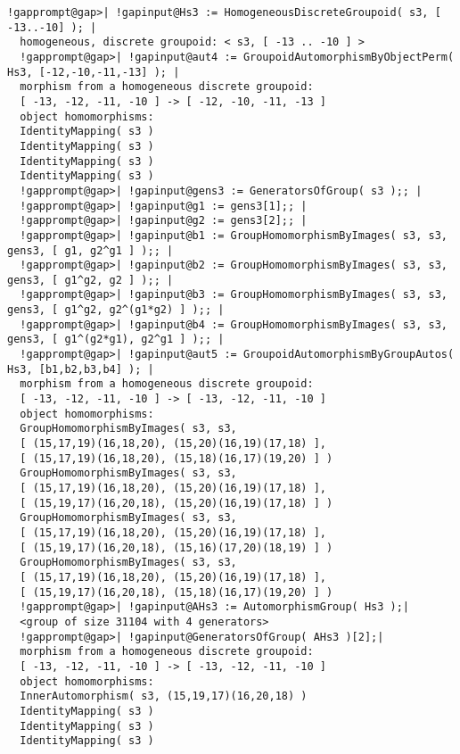 \documentclass[a4paper,11pt]{report}
\begin{document}
{{{\begin{Verbatim}[commandchars=!@|,fontsize=\small,frame=single,label=Example]
  !gapprompt@gap>| !gapinput@Hs3 := HomogeneousDiscreteGroupoid( s3, [ -13..-10] ); |
  homogeneous, discrete groupoid: < s3, [ -13 .. -10 ] >
  !gapprompt@gap>| !gapinput@aut4 := GroupoidAutomorphismByObjectPerm( Hs3, [-12,-10,-11,-13] ); |
  morphism from a homogeneous discrete groupoid:
  [ -13, -12, -11, -10 ] -> [ -12, -10, -11, -13 ]
  object homomorphisms:
  IdentityMapping( s3 )
  IdentityMapping( s3 )
  IdentityMapping( s3 )
  IdentityMapping( s3 )
  !gapprompt@gap>| !gapinput@gens3 := GeneratorsOfGroup( s3 );; |
  !gapprompt@gap>| !gapinput@g1 := gens3[1];; |
  !gapprompt@gap>| !gapinput@g2 := gens3[2];; |
  !gapprompt@gap>| !gapinput@b1 := GroupHomomorphismByImages( s3, s3, gens3, [ g1, g2^g1 ] );; |
  !gapprompt@gap>| !gapinput@b2 := GroupHomomorphismByImages( s3, s3, gens3, [ g1^g2, g2 ] );; |
  !gapprompt@gap>| !gapinput@b3 := GroupHomomorphismByImages( s3, s3, gens3, [ g1^g2, g2^(g1*g2) ] );; |
  !gapprompt@gap>| !gapinput@b4 := GroupHomomorphismByImages( s3, s3, gens3, [ g1^(g2*g1), g2^g1 ] );; |
  !gapprompt@gap>| !gapinput@aut5 := GroupoidAutomorphismByGroupAutos( Hs3, [b1,b2,b3,b4] ); |
  morphism from a homogeneous discrete groupoid:
  [ -13, -12, -11, -10 ] -> [ -13, -12, -11, -10 ]
  object homomorphisms:
  GroupHomomorphismByImages( s3, s3, 
  [ (15,17,19)(16,18,20), (15,20)(16,19)(17,18) ], 
  [ (15,17,19)(16,18,20), (15,18)(16,17)(19,20) ] )
  GroupHomomorphismByImages( s3, s3, 
  [ (15,17,19)(16,18,20), (15,20)(16,19)(17,18) ], 
  [ (15,19,17)(16,20,18), (15,20)(16,19)(17,18) ] )
  GroupHomomorphismByImages( s3, s3, 
  [ (15,17,19)(16,18,20), (15,20)(16,19)(17,18) ], 
  [ (15,19,17)(16,20,18), (15,16)(17,20)(18,19) ] )
  GroupHomomorphismByImages( s3, s3, 
  [ (15,17,19)(16,18,20), (15,20)(16,19)(17,18) ], 
  [ (15,19,17)(16,20,18), (15,18)(16,17)(19,20) ] )
  !gapprompt@gap>| !gapinput@AHs3 := AutomorphismGroup( Hs3 );|
  <group of size 31104 with 4 generators>
  !gapprompt@gap>| !gapinput@GeneratorsOfGroup( AHs3 )[2];|
  morphism from a homogeneous discrete groupoid:
  [ -13, -12, -11, -10 ] -> [ -13, -12, -11, -10 ]
  object homomorphisms:
  InnerAutomorphism( s3, (15,19,17)(16,20,18) )
  IdentityMapping( s3 )
  IdentityMapping( s3 )
  IdentityMapping( s3 )
  
\end{Verbatim}
 

 }

 

}}
\end{document}
